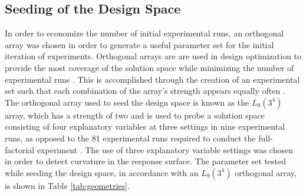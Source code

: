 \subsection{Seeding of the Design Space}
\label{ssec:seeding}
In order to economize the number of initial experimental runs, an orthogonal array was chosen in order to generate a useful parameter set for the initial iteration of experiments. Orthogonal arrays are are used in design optimization to provide the most coverage of the solution space while minimizing the number of experimental runs \cite{yokoyama1993taguchi}. This is accomplished through the creation of an experimental set such that each combination of the array's strength appears equally often \cite{hedayat2012orthogonal}. The orthogonal array used to seed the design space is known as the $L_9 (3^4)$ array, which has a strength of two and is used to probe a solution space consisting of four explanatory variables at three settings in nine experimental runs, as opposed to the 81 experimental runs required to conduct the full-factorial experiment \cite{ting2004preparation}. The use of three explanatory variable settings was chosen in order to detect curvature in the response surface. The parameter set tested while seeding the design space, in accordance with an $L_9 (3^4)$ orthogonal array, is shown in Table \ref{tab:geometries}.

